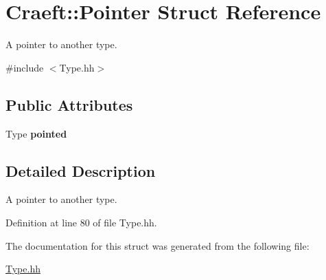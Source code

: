 \hypertarget{struct_craeft_1_1_pointer}{}\section{Craeft\+:\+:Pointer Struct Reference}
\label{struct_craeft_1_1_pointer}


A pointer to another type.  




{\ttfamily \#include $<$Type.\+hh$>$}

\subsection*{Public Attributes}
\begin{DoxyCompactItemize}
\item 
\hypertarget{struct_craeft_1_1_pointer_a3bd9b25e171f9fa66a7ddf06e533b025}{}\label{struct_craeft_1_1_pointer_a3bd9b25e171f9fa66a7ddf06e533b025} 
Type {\bfseries pointed}
\end{DoxyCompactItemize}


\subsection{Detailed Description}
A pointer to another type. 

Definition at line 80 of file Type.\+hh.



The documentation for this struct was generated from the following file\+:\begin{DoxyCompactItemize}
\item 
\hyperlink{_type_8hh}{Type.\+hh}\end{DoxyCompactItemize}

